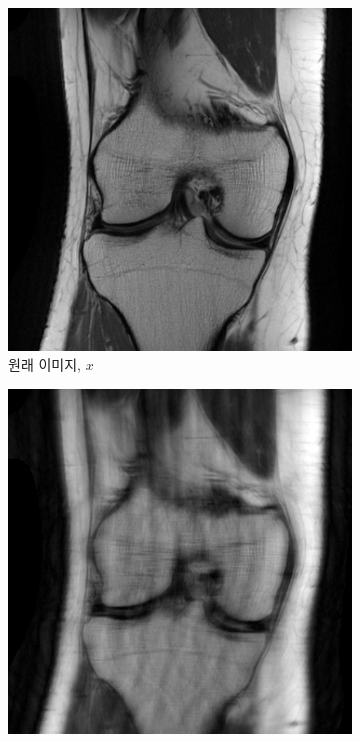 \documentclass[twoside]{article}
\begin{document}
\begin{figure}[h]
  \centering
  \begin{subfigure}[b]{0.3\textwidth}
   \centering
   \includegraphics[width=\textwidth]{figs/ref.png}
   \caption{원래 이미지, $x$}
  \end{subfigure}
  \begin{subfigure}[b]{0.3\textwidth}
   \centering
   \includegraphics[width=\textwidth]{figs/zero.png}

\end{subfigure}
\end{figure}
\end{document}

